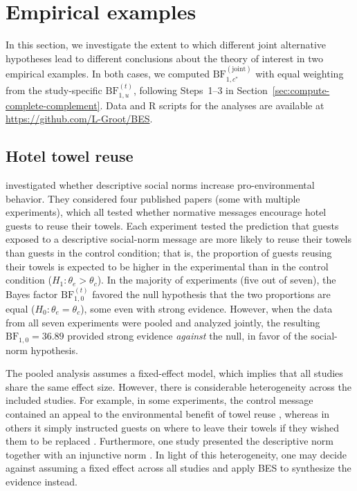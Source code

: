 \documentclass[letterpaper,11pt,oneside]{article}
\begin{document}
\section{Empirical examples}

In this section, we investigate the extent to which different joint alternative hypotheses lead to different conclusions about the theory of interest in two empirical examples. In both cases, we computed $\mathrm{BF}_{1,c^{*}}^{(\text{joint})}$ with equal weighting from the study-specific $\mathrm{BF}_{1,u}^{(t)}$, following Steps~1--3 in Section~\ref{sec:compute-complete-complement}. Data and R scripts for the analyses are available at \url{https://github.com/L-Groot/BES}.

\subsection{Hotel towel reuse%
}

\textcite{scheibehenneBayesianEvidenceSynthesis2016} investigated whether descriptive social norms increase pro-environmental behavior. They considered four published papers (some with multiple experiments), which all tested whether normative messages encourage hotel guests to reuse their towels. Each experiment tested the prediction that guests exposed to a descriptive social-norm message are more likely to reuse their towels than guests in the control condition; that is, the proportion of guests reusing their towels is expected to be higher in the experimental than in the control condition ($H_1: \theta_e > \theta_c$). In the majority of experiments (five out of seven), the Bayes factor $\mathrm{BF}_{1,0}^{(t)}$ favored the null hypothesis that the two proportions are equal ($H_0: \theta_e = \theta_c$), some even with strong evidence. However, when the data from all seven experiments were pooled and analyzed jointly, the resulting $\mathrm{BF}_{1,0}=36.89$ provided strong evidence \textit{against} the null, in favor of the social-norm hypothesis.

The pooled analysis assumes a fixed-effect model, which implies that all studies share the same effect size. However, there is considerable heterogeneity across the included studies. For example, in some experiments, the control message contained an appeal to the environmental benefit of towel reuse \parencite{goldsteinRoomViewpointUsing2008, bohnerRoomViewpointRevisited2014}, whereas in others it simply instructed guests on where to leave their towels if they wished them to be replaced \parencite{schultzUsingNormativeSocial2008}. Furthermore, one study presented the descriptive norm together with an injunctive norm \parencite{schultzUsingNormativeSocial2008}. In light of this heterogeneity, one may decide against assuming a fixed effect across all studies and apply BES to synthesize the evidence instead. 
\end{document}
